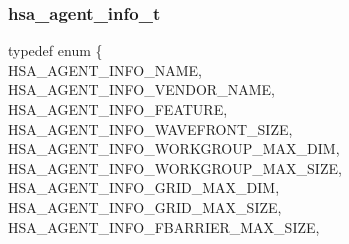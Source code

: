 \documentclass[final]{book}
\newcommand{\reftyp}[1]{#1}
\newcommand{\refenu}[1]{\reftyp{#1}}
\newenvironment{mylongtable}{\rowcolors{0}{lightgray}{lightgray}\longtable} {
\endlongtable}
\begin{document}
\subsubsection{hsa_\-agent_\-info_\-t}
\vspace{-5.5mm}\begin{mylongtable}{@{}p{\textwidth}}
\rule{0pt}{3ex}typedef enum \{\\\hspace{1.7em}\hypertarget{group__agentinfo_1gga39d0684207d95717d96319573b3e4a42a06b3ca6080e3bfd4d5b07db91d766e4c}{\refenu{HSA_\-AGENT_\-INFO_\-NAME}},\\
\hspace{1.7em}\hypertarget{group__agentinfo_1gga39d0684207d95717d96319573b3e4a42ac9e0c3d4f881d6de12ff8792eb92292c}{\refenu{HSA_\-AGENT_\-INFO_\-VENDOR_\-NAME}},\\
\hspace{1.7em}\hypertarget{group__agentinfo_1gga39d0684207d95717d96319573b3e4a42a4ce35a53f20e53b76c7cc7697f08ea04}{\refenu{HSA_\-AGENT_\-INFO_\-FEATURE}},\\
\hspace{1.7em}\hypertarget{group__agentinfo_1gga39d0684207d95717d96319573b3e4a42a2474a5a57ecbf494156769f408ded8fd}{\refenu{HSA_\-AGENT_\-INFO_\-WAVEFRONT_\-SIZE}},\\
\hspace{1.7em}\hypertarget{group__agentinfo_1gga39d0684207d95717d96319573b3e4a42a595eea133327c6c6110c02a0661a06d6}{\refenu{HSA_\-AGENT_\-INFO_\-WORKGROUP_\-MAX_\-DIM}},\\
\hspace{1.7em}\hypertarget{group__agentinfo_1gga39d0684207d95717d96319573b3e4a42ade0ccd571bdc023d644d2337621e91f6}{\refenu{HSA_\-AGENT_\-INFO_\-WORKGROUP_\-MAX_\-SIZE}},\\
\hspace{1.7em}\hypertarget{group__agentinfo_1gga39d0684207d95717d96319573b3e4a42a512597f1fd2c2e6baee29f364ccd924f}{\refenu{HSA_\-AGENT_\-INFO_\-GRID_\-MAX_\-DIM}},\\
\hspace{1.7em}\hypertarget{group__agentinfo_1gga39d0684207d95717d96319573b3e4a42a16cd0e9d2e75ee3db1c22738b2cad8f6}{\refenu{HSA_\-AGENT_\-INFO_\-GRID_\-MAX_\-SIZE}},\\
\hspace{1.7em}\hypertarget{group__agentinfo_1gga39d0684207d95717d96319573b3e4a42a81f9780e49dd38b4f836289fd3647bad}{\refenu{HSA_\-AGENT_\-INFO_\-FBARRIER_\-MAX_\-SIZE}},\\

\end{mylongtable}
\end{document}
